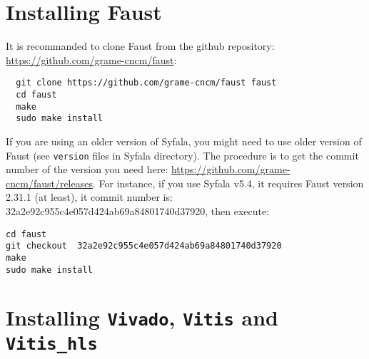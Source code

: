 
\section{Installing Faust}
\label{faust-install}
It is recommanded to clone Faust from the github repository: \url{https://github.com/grame-cncm/faust}:
\begin{verbatim}
  git clone https://github.com/grame-cncm/faust faust
  cd faust
  make
  sudo make install
\end{verbatim}
If you are using an older version of Syfala, you might need to use older version of Faust (see {\tt version} files in Syfala directory). The procedure is to get the commit number of the version you need here: \url{https://github.com/grame-cncm/faust/releases}. For instance, if you use Syfala v5.4, it requires Faust version 2.31.1 (at least), it commit number is:  32a2e92c955c4e057d424ab69a84801740d37920, then execute:
\begin{verbatim}
cd faust 
git checkout  32a2e92c955c4e057d424ab69a84801740d37920
make 
sudo make install
\end{verbatim}

\section{Installing {\tt Vivado}, {\tt Vitis} and {\tt Vitis\_hls} }
\label{vitis-install}


